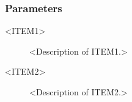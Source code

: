 %

\subsubsection{Parameters}

\begin{description}

\item [<ITEM1>] <Description of ITEM1.>

\item [<ITEM2>] <Description of ITEM2.>

\end{description}









